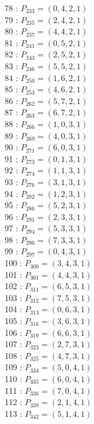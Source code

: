 \documentclass{article}
\begin{document}
{\begin{multicols}{3}
78 : $P_{233}=( 0, 4, 2, 1 )$\\
79 : $P_{235}=( 2, 4, 2, 1 )$\\
80 : $P_{237}=( 4, 4, 2, 1 )$\\
81 : $P_{241}=( 0, 5, 2, 1 )$\\
82 : $P_{243}=( 2, 5, 2, 1 )$\\
83 : $P_{246}=( 5, 5, 2, 1 )$\\
84 : $P_{250}=( 1, 6, 2, 1 )$\\
85 : $P_{253}=( 4, 6, 2, 1 )$\\
86 : $P_{262}=( 5, 7, 2, 1 )$\\
87 : $P_{263}=( 6, 7, 2, 1 )$\\
88 : $P_{266}=( 1, 0, 3, 1 )$\\
89 : $P_{269}=( 4, 0, 3, 1 )$\\
90 : $P_{271}=( 6, 0, 3, 1 )$\\
91 : $P_{273}=( 0, 1, 3, 1 )$\\
92 : $P_{274}=( 1, 1, 3, 1 )$\\
93 : $P_{276}=( 3, 1, 3, 1 )$\\
94 : $P_{282}=( 1, 2, 3, 1 )$\\
95 : $P_{286}=( 5, 2, 3, 1 )$\\
96 : $P_{291}=( 2, 3, 3, 1 )$\\
97 : $P_{294}=( 5, 3, 3, 1 )$\\
98 : $P_{296}=( 7, 3, 3, 1 )$\\
99 : $P_{297}=( 0, 4, 3, 1 )$\\
100 : $P_{300}=( 3, 4, 3, 1 )$\\
101 : $P_{301}=( 4, 4, 3, 1 )$\\
102 : $P_{311}=( 6, 5, 3, 1 )$\\
103 : $P_{312}=( 7, 5, 3, 1 )$\\
104 : $P_{313}=( 0, 6, 3, 1 )$\\
105 : $P_{316}=( 3, 6, 3, 1 )$\\
106 : $P_{319}=( 6, 6, 3, 1 )$\\
107 : $P_{323}=( 2, 7, 3, 1 )$\\
108 : $P_{325}=( 4, 7, 3, 1 )$\\
109 : $P_{334}=( 5, 0, 4, 1 )$\\
110 : $P_{335}=( 6, 0, 4, 1 )$\\
111 : $P_{336}=( 7, 0, 4, 1 )$\\
112 : $P_{339}=( 2, 1, 4, 1 )$\\
113 : $P_{342}=( 5, 1, 4, 1 )$\\

\end{multicols}}
\end{document}
